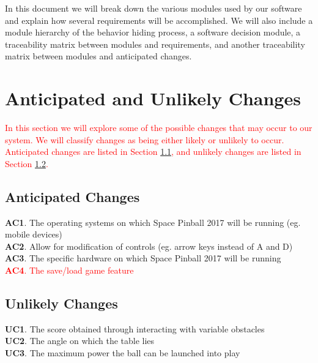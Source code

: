 \documentclass[12pt, titlepage]{article}
\begin{document}
In this document we will break down the various modules used by our software and explain how several requirements will be accomplished. We will also include a module hierarchy of the behavior hiding process, a software decision module, a traceability matrix between modules and requirements, and another traceability matrix between modules and anticipated changes. 



\section{Anticipated and Unlikely Changes} \label{SecChange}

\textcolor{red}{In this section we will explore some of the possible changes that may occur to our system. We will classify changes as being either likely or unlikely to occur. Anticipated changes are listed in Section \ref{SecAchange}, and unlikely changes are listed in Section \ref{SecUchange}.}

\subsection{Anticipated Changes} \label{SecAchange}

\textbf{AC1}. The operating systems on which Space Pinball 2017 will be running (eg. mobile devices)\\

\textbf{AC2}. Allow for modification of controls (eg. arrow keys instead of A and D)\\

\textbf{AC3}. The specific hardware on which Space Pinball 2017 will be running\\

\textcolor{red}{\textbf{AC4}. The save/load game feature}\\


\subsection{Unlikely Changes} \label{SecUchange}


\textbf{UC1}. The score obtained through interacting with variable obstacles\\

\textbf{UC2}. The angle on which the table lies\\

\textbf{UC3}. The maximum power the ball can be launched into play\\
\end{document}

